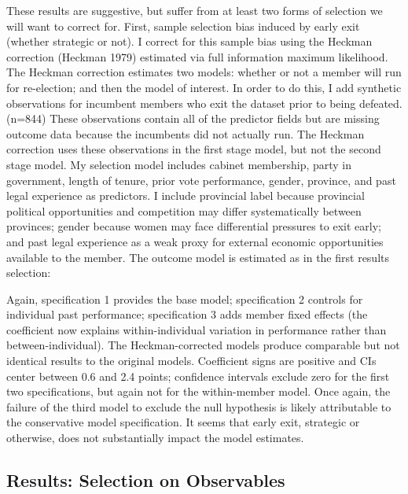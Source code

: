 \documentclass[letter,12pt]{article}
\begin{document}
These results are suggestive, but suffer from at least two forms of selection we will want to correct for. First, sample selection bias induced by early exit (whether strategic or not). I correct for this sample bias using the Heckman correction (Heckman 1979) estimated via full information maximum likelihood. The Heckman correction estimates two models: whether or not a member will run for re-election; and then the model of interest. In order to do this, I add synthetic observations for incumbent members who exit the dataset prior to being defeated. (n=844) These observations contain all of the predictor fields but are missing outcome data because the incumbents did not actually run. The Heckman correction uses these observations in the first stage model, but not the second stage model. My selection model includes cabinet membership, party in government, length of tenure, prior vote performance, gender, province, and past legal experience as predictors. I include provincial label because provincial political opportunities and competition may differ systematically between provinces; gender because women may face differential pressures to exit early; and past legal experience as a weak proxy for external economic opportunities available to the member. The outcome model is estimated as in the first results selection:



Again, specification 1 provides the base model; specification 2 controls for individual past performance; specification 3 adds member fixed effects (the coefficient now explains within-individual variation in performance rather than between-individual). The Heckman-corrected models produce comparable but not identical results to the original models. Coefficient signs are positive and CIs center between 0.6 and 2.4 points; confidence intervals exclude zero for the first two specifications, but again not for the within-member model. Once again, the failure of the third model to exclude the null hypothesis is likely attributable to the conservative model specification. It seems that early exit, strategic or otherwise, does not substantially impact the model estimates.

\subsection*{Results: Selection on Observables}
\end{document}
